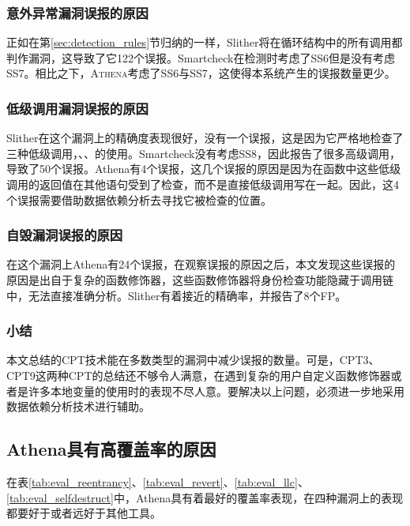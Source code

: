 \subsubsection{意外异常漏洞误报的原因}

正如在第\ref{sec:detection_rules}节归纳的一样，Slither将在循环结构中的所有调用都判作漏洞，这导致了它122个误报。Smartcheck在检测时考虑了SS6但是没有考虑SS7。相比之下，\textsc{Athena}考虑了SS6与SS7，这使得本系统产生的误报数量更少。

\subsubsection{低级调用漏洞误报的原因}

Slither在这个漏洞上的精确度表现很好，没有一个误报，这是因为它严格地检查了三种低级调用，、、的使用。Smartcheck没有考虑SS8，因此报告了很多高级调用，导致了50个误报。Athena有4个误报，这几个误报的原因是因为在函数中这些低级调用的返回值在其他语句受到了检查，而不是直接低级调用写在一起。因此，这4个误报需要借助数据依赖分析去寻找它被检查的位置。

\subsubsection{自毁漏洞误报的原因}

在这个漏洞上Athena有24个误报，在观察误报的原因之后，本文发现这些误报的原因是出自于复杂的函数修饰器，这些函数修饰器将身份检查功能隐藏于调用链中，无法直接准确分析。Slither有着接近的精确率，并报告了8个FP。

\subsubsection{小结}

本文总结的CPT技术能在多数类型的漏洞中减少误报的数量。可是，CPT3、CPT9这两种CPT的总结还不够令人满意，在遇到复杂的用户自定义函数修饰器或者是许多本地变量的使用时的表现不尽人意。要解决以上问题，必须进一步地采用数据依赖分析技术进行辅助。

\subsection{Athena具有高覆盖率的原因}

在表\ref{tab:eval_reentrancy}、\ref{tab:eval_revert}、\ref{tab:eval_llc}、\ref{tab:eval_selfdestruct}中，Athena具有着最好的覆盖率表现，在四种漏洞上的表现都要好于或者远好于其他工具。

